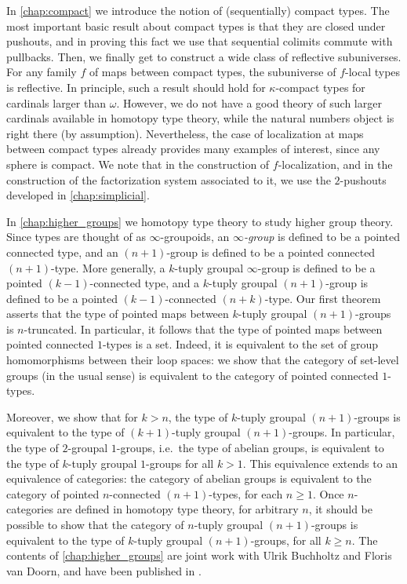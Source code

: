 In \cref{chap:compact} we introduce the notion of (sequentially) compact types. The most important basic result about compact types is that they are closed under pushouts, and in proving this fact we use that sequential colimits commute with pullbacks.
Then, we finally get to construct a wide class of reflective subuniverses. For any family $f$ of maps between compact types, the subuniverse of $f$-local types is reflective. In principle, such a result should hold for $\kappa$-compact types for cardinals larger than $\omega$. However, we do not have a good theory of such larger cardinals available in homotopy type theory, while the natural numbers object is right there (by assumption). Nevertheless, the case of localization at maps between compact types already provides many examples of interest, since any sphere is compact. We note that in the construction of $f$-localization, and in the construction of the factorization system associated to it, we use the $2$-pushouts developed in \cref{chap:simplicial}.

In \cref{chap:higher_groups} we homotopy type theory to study higher group theory. Since types are thought of as $\infty$-groupoids, an \emph{$\infty$-group} is defined to be a pointed connected type, and an $(n+1)$-group is defined to be a pointed connected $(n+1)$-type. More generally, a $k$-tuply groupal $\infty$-group is defined to be a pointed $(k-1)$-connected type, and a $k$-tuply groupal $(n+1)$-group is defined to be a pointed $(k-1)$-connected $(n+k)$-type. Our first theorem asserts that the type of pointed maps between $k$-tuply groupal $(n+1)$-groups is $n$-truncated. In particular, it follows that the type of pointed maps between pointed connected $1$-types is a set. Indeed, it is equivalent to the set of group homomorphisms between their loop spaces: we show that the category of set-level groups (in the usual sense) is equivalent to the category of pointed connected $1$-types. 

Moreover, we show that for $k> n$, the type of $k$-tuply groupal $(n+1)$-groups is equivalent to the type of $(k+1)$-tuply groupal $(n+1)$-groups. In particular, the type of $2$-groupal $1$-groups, i.e.~the type of abelian groups, is equivalent to the type of $k$-tuply groupal $1$-groups for all $k>1$. This equivalence extends to an equivalence of categories: the category of abelian groups is equivalent to the category of pointed $n$-connected $(n+1)$-types, for each $n\geq 1$. Once $n$-categories are defined in homotopy type theory, for arbitrary $n$, it should be possible to show that the category of $n$-tuply groupal $(n+1)$-groups is equivalent to the type of $k$-tuply groupal $(n+1)$-groups, for all $k\geq n$. The contents of \cref{chap:higher_groups} are joint work with Ulrik Buchholtz and Floris van Doorn, and have been published in \cite{BuchholtzDoornRijke}.

